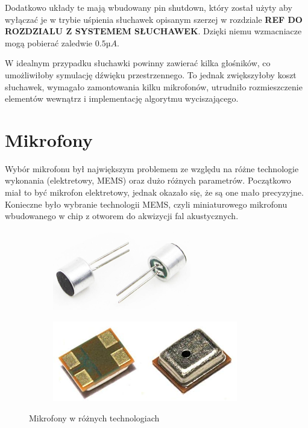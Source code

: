 Dodatkowo układy te mają wbudowany pin shutdown, który został użyty aby wyłączać je w trybie uśpienia słuchawek opisanym szerzej w rozdziale \textbf{REF DO ROZDZIALU Z SYSTEMEM SŁUCHAWEK}. Dzięki niemu wzmacniacze mogą pobierać zaledwie $ 0.5 µA $.

W idealnym przypadku słuchawki powinny zawierać kilka głośników, co umożliwiłoby symulację dźwięku przestrzennego. To jednak zwiększyłoby koszt słuchawek, wymagało zamontowania kilku mikrofonów, utrudniło rozmieszczenie elementów wewnątrz i implementację algorytmu wyciszającego.


\section{Mikrofony}
\label{cha:mikrofony}

Wybór mikrofonu był największym problemem ze względu na różne technologie wykonania (elektretowy, MEMS) oraz dużo różnych parametrów. Początkowo miał to być mikrofon elektretowy, jednak okazało się, że są one mało precyzyjne. Konieczne było wybranie technologii MEMS, czyli miniaturowego mikrofonu wbudowanego w chip z otworem do akwizycji fal akustycznych.

\begin{figure}[H]
	\centering
	\begin{subfigure}{.45\textwidth}
		\centering
		\includegraphics[height=3.5cm]{zdjecia/mic_electret.jpg}
	\end{subfigure}
	\begin{subfigure}{.45\textwidth}
		\centering
		\includegraphics[height=3.5cm]{zdjecia/mic_mems.jpg}
	\end{subfigure}
	\caption{\label{mikrofony} Mikrofony w różnych technologiach}
\end{figure}

